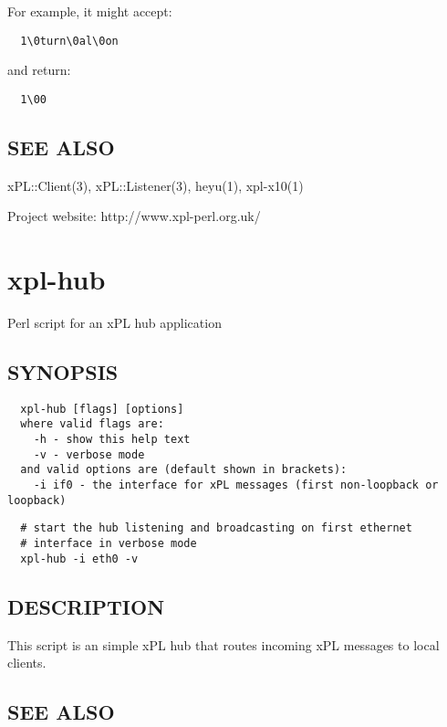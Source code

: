 For example, it might accept:

\begin{verbatim}
  1\0turn\0al\0on
\end{verbatim}


and return:

\begin{verbatim}
  1\00
\end{verbatim}
\subsection*{SEE ALSO\label{xpl-heyu-helper_SEE_ALSO}}


xPL::Client(3), xPL::Listener(3), heyu(1), xpl-x10(1)



Project website: http://www.xpl-perl.org.uk/

\section{xpl-hub\label{xpl-hub}}


Perl script for an xPL hub application

\subsection*{SYNOPSIS\label{xpl-hub_SYNOPSIS}}
\begin{verbatim}
  xpl-hub [flags] [options]
  where valid flags are:
    -h - show this help text
    -v - verbose mode
  and valid options are (default shown in brackets):
    -i if0 - the interface for xPL messages (first non-loopback or loopback)
\end{verbatim}
\begin{verbatim}
  # start the hub listening and broadcasting on first ethernet
  # interface in verbose mode
  xpl-hub -i eth0 -v
\end{verbatim}
\subsection*{DESCRIPTION\label{xpl-hub_DESCRIPTION}}


This script is an simple xPL hub that routes incoming xPL messages to
local clients.

\subsection*{SEE ALSO\label{xpl-hub_SEE_ALSO}}


